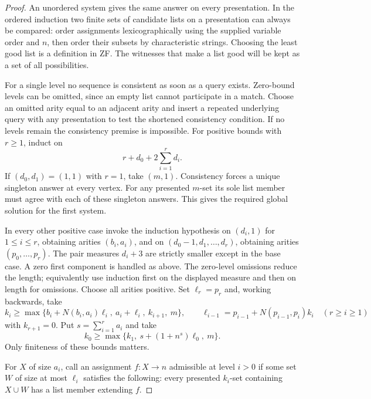 \documentclass[11pt]{article}
\begin{document}
\begin{proof}
An unordered system gives the same answer on every presentation. In the ordered induction two finite sets of candidate lists on a presentation can always be compared: order assignments lexicographically using the supplied variable order and $n$, then order their subsets by characteristic strings. Choosing the least good list is a definition in ZF. The witnesses that make a list good will be kept as a set of all possibilities.

For a single level no sequence is consistent as soon as a query exists. Zero-bound levels can be omitted, since an empty list cannot participate in a match. Choose an omitted arity equal to an adjacent arity and insert a repeated underlying query with any presentation to test the shortened consistency condition. If no levels remain the consistency premise is impossible. For positive bounds with $r\geq1$, induct on
\[
                    r+d_0+2\sum_{i=1}^r d_i .
\]
If $(d_0,d_1)=(1,1)$ with $r=1$, take $(m,1)$. Consistency forces a unique singleton answer at every vertex. For any presented $m$-set its sole list member must agree with each of these singleton answers. This gives the required global solution for the first system.

In every other positive case invoke the induction hypothesis on $(d_i,1)$ for $1\leq i\leq r$, obtaining arities $(b_i,a_i)$, and on $(d_0-1,d_1,\ldots,d_r)$, obtaining arities $(p_0,\ldots,p_r)$. The pair measures $d_i+3$ are strictly smaller except in the base case. A zero first component is handled as above. The zero-level omissions reduce the length; equivalently use induction first on the displayed measure and then on length for omissions. Choose all arities positive. Set $\ell_r=p_r$ and, working backwards, take
\[
 k_i\geq\max\{b_i+N(b_i,a_i)\ell_i,\ a_i+\ell_i,\ k_{i+1},\ m\},
 \qquad \ell_{i-1}=p_{i-1}+N(p_{i-1},p_i)k_i
 \quad (r\geq i\geq1)
\]
with $k_{r+1}=0$. Put $s=\sum_{i=1}^r a_i$ and take
\[
                  k_0\geq\max\{k_1,\ s+(1+n^s)\ell_0,\ m\}.
\]
Only finiteness of these bounds matters.

For $X$ of size $a_i$, call an assignment $f:X\to n$ admissible at level $i>0$ if some set $W$ of size at most $\ell_i$ satisfies the following: every presented $k_i$-set containing $X\cup W$ has a list member extending $f$.


\end{proof}
\end{document}

